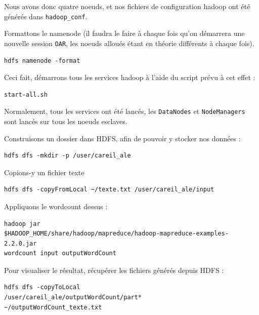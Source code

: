 \par Nous avons donc quatre noeuds, et nos fichiers de configuration hadoop ont été générés dans \texttt{hadoop\_conf}.

\par Formattons le namenode (il faudra le faire à chaque fois qu'on démarrera une nouvelle session \texttt{OAR}, les noeuds alloués étant en théorie différents à chaque fois).
\begin{verbatim}
hdfs namenode -format
\end{verbatim}

\par Ceci fait, démarrons tous les services hadoop à l'aide du script prévu à cet effet :
\begin{verbatim}
start-all.sh
\end{verbatim}

\par Normalement, tous les services ont été lancés, les \texttt{DataNodes} et \texttt{NodeManagers} sont lancés sur tous les noeuds esclaves.

\par Construisons un dossier dans HDFS, afin de pouvoir y stocker nos données :

\begin{verbatim}
hdfs dfs -mkdir -p /user/careil_ale
\end{verbatim}

\par Copions-y un fichier texte

\begin{verbatim}
hdfs dfs -copyFromLocal ~/texte.txt /user/careil_ale/input
\end{verbatim}

\par Appliquons le wordcount dessus :

\begin{verbatim}
hadoop jar 
$HADOOP_HOME/share/hadoop/mapreduce/hadoop-mapreduce-examples-2.2.0.jar 
wordcount input outputWordCount
\end{verbatim}

\par Pour visualiser le résultat, récupérer les fichiers générés depuis HDFS :

\begin{verbatim}
hdfs dfs -copyToLocal 
/user/careil_ale/outputWordCount/part* 
~/outputWordCount_texte.txt
\end{verbatim}



